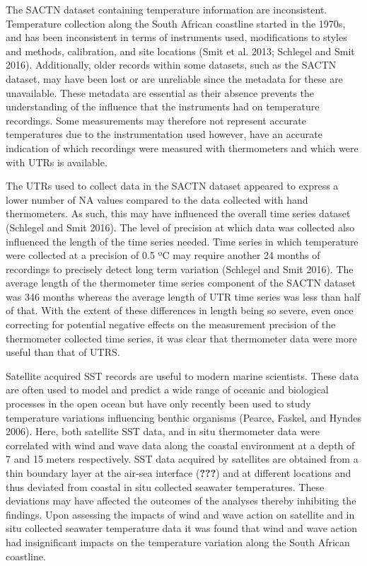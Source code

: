 \documentclass[12pt,A4paper,]{article}
\begin{document}
The SACTN dataset containing temperature information are inconsistent.
Temperature collection along the South African coastline started in the
1970s, and has been inconsistent in terms of instruments used,
modifications to styles and methods, calibration, and site locations
(Smit et al. 2013; Schlegel and Smit 2016). Additionally, older records
within some datasets, such as the SACTN dataset, may have been lost or
are unreliable since the metadata for these are unavailable. These
metadata are essential as their absence prevents the understanding of
the influence that the instruments had on temperature recordings. Some
measurements may therefore not represent accurate temperatures due to
the instrumentation used however, have an accurate indication of which
recordings were measured with thermometers and which were with UTRs is
available.

The UTRs used to collect data in the SACTN dataset appeared to express a
lower number of NA values compared to the data collected with hand
thermometers. As such, this may have influenced the overall time series
dataset (Schlegel and Smit 2016). The level of precision at which data
was collected also influenced the length of the time series needed. Time
series in which temperature were collected at a precision of 0.5 ºC may
require another 24 months of recordings to precisely detect long term
variation (Schlegel and Smit 2016). The average length of the
thermometer time series component of the SACTN dataset was 346 months
whereas the average length of UTR time series was less than half of
that. With the extent of these differences in length being so severe,
even once correcting for potential negative effects on the measurement
precision of the thermometer collected time series, it was clear that
thermometer data were more useful than that of UTRS.

Satellite acquired SST records are useful to modern marine scientists.
These data are often used to model and predict a wide range of oceanic
and biological processes in the open ocean but have only recently been
used to study temperature variations influencing benthic organisms
(Pearce, Faskel, and Hyndes 2006). Here, both satellite SST data, and in
situ thermometer data were correlated with wind and wave data along the
coastal environment at a depth of 7 and 15 meters respectively. SST data
acquired by satellites are obtained from a thin boundary layer at the
air-sea interface ({\textbf{???}}) and at different locations and thus
deviated from coastal in situ collected seawater temperatures. These
deviations may have affected the outcomes of the analyses thereby
inhibiting the findings. Upon assessing the impacts of wind and wave
action on satellite and in situ collected seawater temperature data it
was found that wind and wave action had insignificant impacts on the
temperature variation along the South African coastline.
\end{document}

